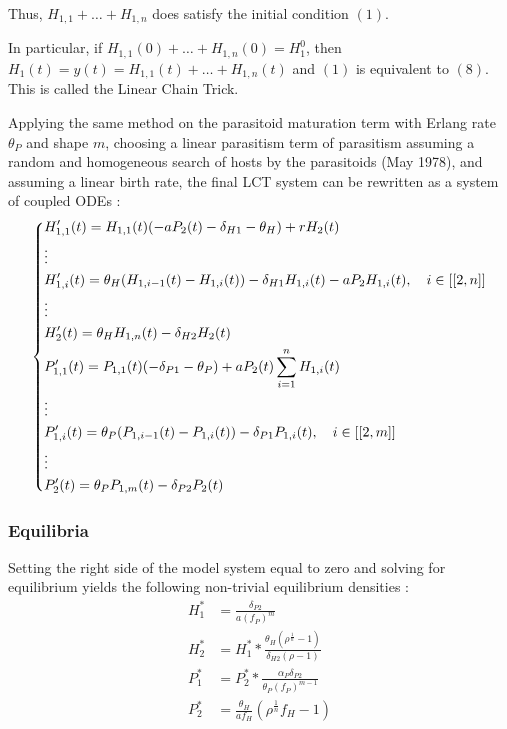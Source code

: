 \documentclass[12pt,a4paper,onecolumn]{article}
\begin{document}
Thus, $H_{1,1} + \dots + H_{1,n}$ does satisfy the initial condition $(1)$.

In particular, if $H_{1,1}(0) + \dots + H_{1,n}(0) =  H_1^0$, then $H_1(t) = y(t) = H_{1,1}(t) + \dots + H_{1,n}(t)$ and $(1)$ is equivalent to $(8)$. This is called the Linear Chain Trick.

Applying the same method on the parasitoid maturation term with Erlang rate $\theta_P$ and shape $m$, choosing a linear parasitism term of parasitism assuming a random and homogeneous search of hosts by the parasitoids (May 1978), and assuming a linear birth rate, the final LCT system can be rewritten as a system of coupled ODEs  :
\begin{equation}
\begin{dcases}
H_{1,1}'(t) = H_{1,1}(t)(-a P_2(t) - \delta_{H1} - \theta_H) + r H_2(t) \\
\vdots \\
H_{1,i}'(t) = \theta_H(H_{1,i-1}(t) - H_{1,i}(t)) - \delta_{H1} H_{1,i}(t) - aP_2H_{1,i}(t), \quad i \in [[2,n]] \\
\vdots \\
H_{2}'(t) = \theta_H H_{1,n}(t) - \delta_{H2} H_{2}(t) \\
P_{1,1}'(t) = P_{1,1}(t)(- \delta_{P1} - \theta_P) + a P_2(t) \sum_{i=1}^{n} H_{1,i}(t) \\
\vdots \\
P_{1,i}'(t) = \theta_P(P_{1,i-1}(t) - P_{1,i}(t)) - \delta_{P1} P_{1,i}(t), \quad i \in [[2,m]] \\
\vdots \\
P_{2}'(t) = \theta_P P_{1,m}(t) - \delta_{P2} P_{2}(t) \\
\end{dcases}
\end{equation}

\subsubsection{Equilibria}

Setting the right side of the model system equal to zero and solving for equilibrium yields the following non-trivial equilibrium densities :
\begin{align}
H_1^* &= \frac{\delta_{P2}}{a(f_P)^m} \nonumber \\
H_2^* &= H_1^* * \frac{\theta_{H} (\rho^{\frac{1}{n}}-1)}{\delta_{H2} (\rho-1)} \nonumber \\
P_1^* &= P_2^* * \frac{\alpha_P \delta_{P2}}{\theta_P (f_P)^{m-1}}  \\
P_2^*&= \frac{\theta_H}{a f_H} (\rho^{\frac{1}{n}}f_H -1) \nonumber
\end{align}
\end{document}
